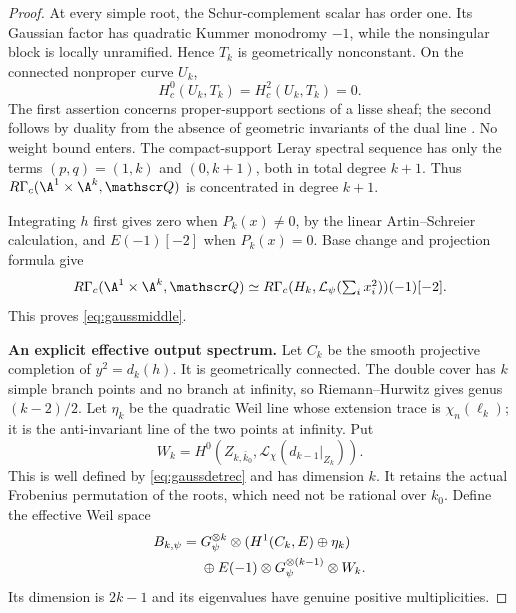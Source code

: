 \begin{proof}
At every simple root, the Schur-complement scalar has order
one. Its Gaussian factor has quadratic Kummer monodromy
$-1$, while the nonsingular block is locally unramified.
Hence $T_k$ is geometrically nonconstant. On the connected
nonproper curve $U_k$,
\[
 H_c^0(U_k,T_k)=H_c^2(U_k,T_k)=0.
\]
The first assertion concerns proper-support sections of a
lisse sheaf; the second follows by duality from the absence
of geometric invariants of the dual line
\cite[\emph{Sommes trig.}, 1.18(b)--(d),
pp.~178--179]{SGA45}. No weight bound enters.
The compact-support Leray spectral sequence has only the
terms $(p,q)=(1,k)$ and $(0,k+1)$, both in total degree
$k+1$. Thus $R\Gamma_c(\A^1\times\A^k,\mathscr Q)$ is
concentrated in degree $k+1$.

Integrating $h$ first gives zero when $P_k(x)\ne0$, by the
linear Artin--Schreier calculation, and $E(-1)[-2]$ when
$P_k(x)=0$. Base change and projection formula give
\[
 R\Gamma_c(\A^1\times\A^k,\mathscr Q)
 \simeq
 R\Gamma_c(H_k,\mathcal L_\psi(\textstyle\sum_i x_i^2))(-1)[-2].
\]
This proves \eqref{eq:gaussmiddle}.

\par\smallskip\noindent\textbf{An explicit effective output spectrum.}\quad
Let $C_k$ be the smooth projective completion of
$y^2=d_k(h)$. It is geometrically connected.
The double cover has $k$ simple branch points and no
branch at infinity, so Riemann--Hurwitz gives genus
$(k-2)/2$. Let $\eta_k$ be the quadratic Weil line whose
extension trace is $\chi_n(\ell_k)$; it is the anti-invariant
line of the two points at infinity. Put
\[
 W_k=H^0(Z_{k,\bar k_0},
             \mathcal L_\chi(d_{k-1}|_{Z_k})).
\]
This is well defined by \eqref{eq:gaussdetrec} and has
dimension $k$. It retains the actual Frobenius permutation
of the roots, which need not be rational over $k_0$.
Define the effective Weil space
\begin{align}
 B_{k,\psi}={}&G_\psi^{\otimes k}\otimes
                 (H^1(C_k,E)\oplus\eta_k)\notag\\
 &\oplus E(-1)\otimes G_\psi^{\otimes(k-1)}\otimes W_k .
 \label{eq:gaussoutput}
\end{align}
Its dimension is $2k-1$ and its eigenvalues have genuine
positive multiplicities.


\end{proof}
